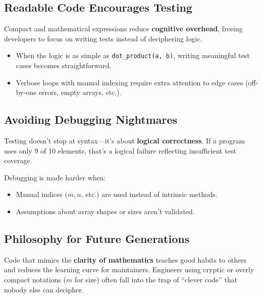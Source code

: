 \documentclass[12pt]{article}
\begin{document}
\subsection*{Readable Code Encourages Testing}

Compact and mathematical expressions reduce \textbf{cognitive overhead}, freeing developers to focus on writing tests instead of deciphering logic.

\begin{itemize}

    \item When the logic is as simple as \texttt{dot\_product(a, b)}, writing meaningful test cases becomes straightforward.

    \item Verbose loops with manual indexing require extra attention to edge cases (off-by-one errors, empty arrays, etc.).

\end{itemize}



\subsection*{Avoiding Debugging Nightmares}

Testing doesn’t stop at syntax---it’s about \textbf{logical correctness}. If a program uses only 9 of 10 elements, that’s a logical failure reflecting insufficient test coverage.



Debugging is made harder when:

\begin{itemize}

    \item Manual indices (\(m, n\), etc.) are used instead of intrinsic methods.

    \item Assumptions about array shapes or sizes aren’t validated.

\end{itemize}



\subsection*{Philosophy for Future Generations}

Code that mimics the \textbf{clarity of mathematics} teaches good habits to others and reduces the learning curve for maintainers. Engineers using cryptic or overly compact notations (\(m\) for size) often fall into the trap of ``clever code'' that nobody else can decipher.
\end{document}
